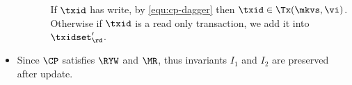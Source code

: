 \begin{itemize}
\begin{itemize}
\begin{itemize}
        If \( \txid \) has write, by \cref{equ:cp-dagger} then \( \txid \in \Tx(\mkvs,\vi) \).
        Otherwise if \( \txid \) is a read only transaction, we add it into \( \txidset'_\rd \).
    \end{itemize}
\end{itemize}

\item Since \( \CP \) satisfies \( \RYW \) and \( \MR \), thus invariants \( I_1 \) and  \( I_2 \) are preserved after update.

\end{itemize}


